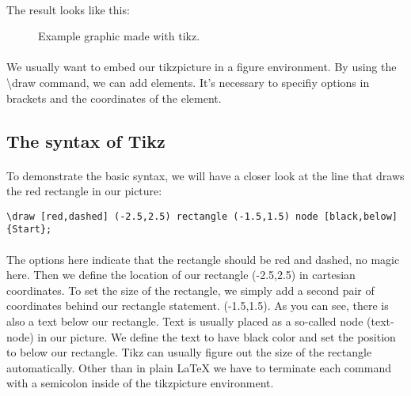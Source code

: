   \paragraph{}
  The result looks like this:
  \begin{figure}[h!]
    \begin{center}
      \caption{Example graphic made with tikz.}
    \end{center}
  \end{figure}

  \paragraph{}
  We usually want to embed our tikzpicture in a figure 
  environment. By using the \textbackslash draw command,
   we can add elements. It's necessary to specifiy 
   options in brackets and the coordinates of the element.


  \subsection{The syntax of Tikz}
  \paragraph{}
  To demonstrate the basic syntax, we will have a closer look at the line that draws the red rectangle in our picture:
  \begin{lstlisting}[language={[LaTeX]TeX},breaklines=true,frame=single]
    \draw [red,dashed] (-2.5,2.5) rectangle (-1.5,1.5) node [black,below] {Start};
  \end{lstlisting}
  \paragraph{}
  The options here indicate that the rectangle should be red and dashed, no magic here. Then we define the location of our rectangle (-2.5,2.5) in cartesian coordinates. To set the size of the rectangle, we simply add a second pair of coordinates behind our rectangle statement. (-1.5,1.5). As you can see, there is also a text below our rectangle. Text is usually placed as a so-called node (text-node) in our picture. We define the text to have black color and set the position to below our rectangle. Tikz can usually figure out the size of the rectangle automatically. Other than in plain LaTeX we have to terminate each command with a semicolon inside of the tikzpicture environment.
